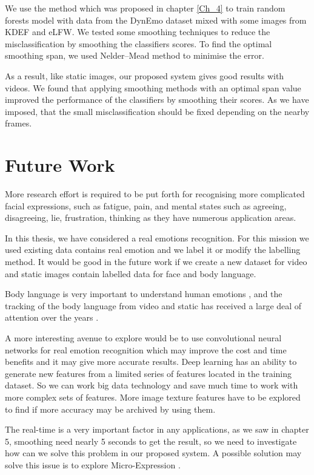 
We use the method which was proposed in chapter \ref{Ch_4} to train random forests model with data from the DynEmo dataset mixed with some images from KDEF and eLFW. 
We tested some smoothing techniques to reduce the misclassification by smoothing the classifiers scores. To find the optimal  smoothing span, we used Nelder–Mead method to minimise the error.

As a result, like static images, our proposed system gives good results with videos. We found that applying smoothing methods with an optimal span value improved the performance of the classifiers by smoothing their scores. As we have imposed, that the small misclassification should be fixed depending on the nearby frames.



\section{Future Work}
More research effort is required to be put forth for recognising more complicated facial expressions, such as fatigue, pain, and mental states such as agreeing, disagreeing, lie, frustration, thinking as they have numerous application areas.

In this thesis, we have considered a real emotions recognition. For this mission we used existing data contains real emotion and we label it or modify the labelling method. It would be good in the future work if we create a new dataset for video and static images contain labelled data for face and body language. 

Body language is very important to understand human emotions \citep{burgoon2016nonverbal}, and the tracking of the body language from video  and static has
received a large deal of attention over the years \citep{aggarwal1999human}. 


A more interesting avenue to explore would be to use convolutional neural networks for real emotion recognition which may improve the cost and time benefits and it may give more accurate results. Deep learning has an ability to generate new features from a limited series of features located in the training dataset. So we can work big data technology and save much time to work with more complex sets of features. More image texture features have to be explored to find if more accuracy may be archived by using them.

The real-time is a very important factor in any applications, as we saw in chapter 5, smoothing need nearly 5 seconds to get the result, so we need to investigate how can we solve this problem in our proposed system. A possible solution may solve this issue is to explore Micro-Expression \citep{borza2017high}.


  